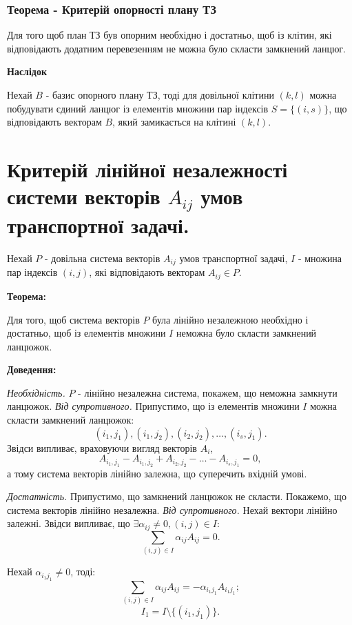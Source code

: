 \documentclass[12pt,a4paper]{report}
\begin{document}
\subsection{Теорема - Критерій опорності плану ТЗ}

Для того щоб план ТЗ був опорним необхідно і достатньо, щоб із клітин, які відповідають додатним перевезенням не можна було скласти замкнений ланцюг.

{\bf Наслідок}

Нехай $B$ - базис опорного плану ТЗ, тоді для довільної клітини $(k,l)$ можна побудувати єдиний ланцюг із елементів множини пар індексів $S=\{(i,s)\}$, що відповідають векторам $B$, який замикається на клітині $(k,l)$.

\clearpage

\chapter{Критерій лінійної незалежності системи векторів $A_{ij}$ умов транспортної задачі.}

Нехай $P$ - довільна система векторів $A_{ij}$ умов транспортної задачі, $I$ - множина пар індексів $(i,j)$, які відповідають векторам $A_{ij} \in P$.

{\bf Теорема:}

Для того, щоб система векторів $P$ була лінійно незалежною необхідно і достатньо, щоб із елементів множини $I$ неможна було скласти замкнений ланцюжок.

{\bf Доведення:}

{\it Необхідність.} $P$ - лінійно незалежна система, покажем, що неможна замкнути ланцюжок. {\it Від супротивного.} Припустимо, що із елементів множини $I$ можна скласти замкнений ланцюжок: $$(i_1,j_1), (i_1,j_2), (i_2,j_2), \dots, (i_s,j_1).$$ Звідси випливає, враховуючи вигляд векторів $A_i$, $$A_{{i_1},{j_1}}-A_{{i_1},{j_2}}+A_{{i_2},{j_2}}-\dots-A_{{i_s},{j_1}}=0,$$ а тому система векторів лінійно залежна, що суперечить вхідній умові.

{\it Достатність.} Припустимо, що замкнений ланцюжок не скласти. Покажемо, що система векторів лінійно незалежна. {\it Від супротивного.} Нехай вектори лінійно залежні. Звідси випливає, що $\exists \alpha_{ij} \neq 0, (i,j) \in I:$ $$\sum_{(i,j) \in I}\alpha_{ij}A_{ij} = 0.$$

Нехай $\alpha_{{i_1}{j_1}} \neq 0$, тоді: 
$$\sum_{(i,j) \in I}\alpha_{ij}A_{ij} = -\alpha_{{i_1}{j_1}}A_{{i_1}{j_1}};$$
$$I_1 = I\setminus\{(i_1,j_1)\}.$$
\end{document}
